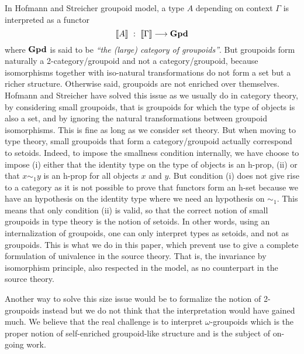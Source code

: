 In Hofmann and Streicher groupoid model, a type $A$ depending on
context $\Gamma$ is interpreted as a functor 
$$
\sem{A} \ : \ \sem{\Gamma} \longrightarrow \GPD
$$
%
where $\mathbf{Gpd}$ is said to be \emph{``the (large) category of groupoids''}. 
%
But groupoids form naturally a 2-category/groupoid and not a
category/groupoid, because isomorphisms together with iso-natural
transformations do not form a set but a richer structure. Otherwise
said, groupoids are not enriched over themselves.
%
Hofmann and Streicher have solved this issue as we usually do in
category theory, by considering small groupoids, that is groupoids for
which the type of objects is also a set, and by ignoring the natural
transformations between groupoid isomorphisms. This is fine as long as we consider set theory.
%
But when moving to type theory, small groupoids that form a
category/groupoid actually correspond to setoids. Indeed, to impose the
smallness condition internally, we have choose to impose (i) either that
the identity type on the type of objects is an h-prop, (ii) or that $x
\sim_1 y$ is an h-prop for all objects $x$ and $y$. But
condition (i) does not give rise to a category as it is not possible to prove that
functors form an h-set because we have an hypothesis on the identity type
where we need an hypothesis on $\sim_1$. 
%
This means that only condition (ii) is valid, so that the
correct notion of small groupoids in type theory is the notion of
setoids.
%
In other words, using an internalization of groupoids, one can only
interpret types as setoids, and not as groupoids. This is what we do
in this paper, which prevent use to give a complete formulation of
univalence in the source theory. That is, the invariance by
isomorphism principle, also respected in the model, as no counterpart
in the source theory. 

Another way to solve this size issue would be to formalize the notion of
2-groupoids instead but we do not think that the interpretation would
have gained much. We believe that the real challenge is to interpret
$\omega$-groupoids which is the proper notion of self-enriched 
groupoid-like structure and is the subject of on-going work.


